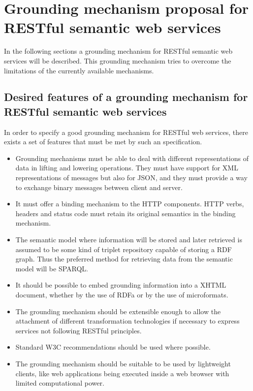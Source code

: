\section{Grounding mechanism proposal for RESTful semantic web services}

In the following sections a grounding mechanism for RESTful semantic web services will be described. This grounding mechanism tries to overcome the limitations of the currently available mechanisms. 

\subsection{Desired features of a grounding mechanism for RESTful semantic web services}

In order to specify a good grounding mechanism for RESTful web services, there exists a set of features that must be met by such an specification. 

\begin{itemize}
  \item Grounding mechanisms must be able to deal with different representations of data in lifting and lowering operations. They must have support for XML representations of messages but also for JSON, and they must provide a way to exchange binary messages between client and server.
  \item It must offer a binding mechanism to the HTTP components. HTTP verbs, headers and status code must retain its original semantics in the binding mechanism.
  \item The semantic model where information will be stored and later retrieved is assumed to be some kind of triplet repository capable of storing a RDF graph. Thus the preferred method for retrieving data from the semantic model will be SPARQL.
   \item It should be possible to embed grounding information into a XHTML document, whether by the use of RDFa or by the use of microformats.
   \item The grounding mechanism should be extensible enough to allow the attachment of different transformation technologies if necessary to express services not following RESTful principles.
   \item Standard W3C recommendations should be used where possible.
   \item The grounding mechanism should be suitable to be used by lightweight clients, like web applications being executed inside a web browser with limited computational power.
\end{itemize}


